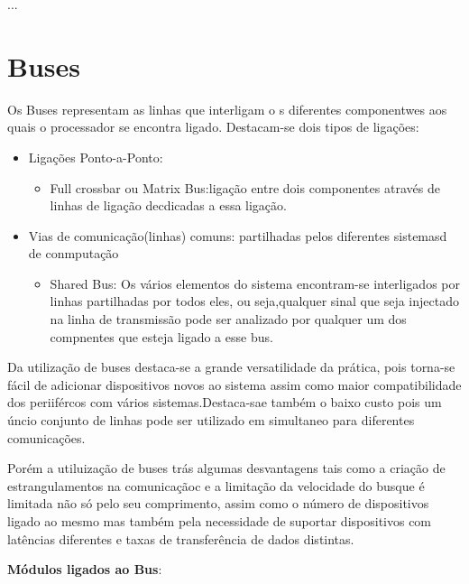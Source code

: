 \documentclass[10pt,a4paper]{paper}
\begin{document}
	...
	
	\newpage
	
	\section*{Buses}
	
	Os Buses representam as linhas que interligam o s diferentes componentwes aos quais o processador se encontra ligado.
	Destacam-se dois tipos de ligações:
	\begin{itemize}
		\item Ligações Ponto-a-Ponto:
		\begin{itemize}
			\item Full crossbar ou Matrix Bus:ligação entre dois componentes através de linhas de ligação decdicadas a essa ligação.
		\end{itemize}
		\item Vias de comunicação(linhas) comuns: partilhadas pelos diferentes sistemasd de conmputação
		\begin{itemize}
			\item Shared Bus: Os vários elementos do sistema encontram-se interligados por linhas partilhadas por todos eles, ou seja,qualquer sinal que seja injectado na linha de transmissão pode ser analizado por qualquer um dos compnentes que esteja ligado a esse bus.
		\end{itemize}
	\end{itemize}
	
	Da utilização de buses destaca-se a grande  versatilidade da prática, pois torna-se fácil de adicionar dispositivos novos ao sistema assim como maior compatibilidade dos periifércos com vários sistemas.Destaca-sae também o baixo custo  pois um úncio conjunto de linhas pode ser utilizado em simultaneo para diferentes comunicações.
	
	Porém a utiluização de buses trás algumas desvantagens tais como a criação de estrangulamentos na comunicaçãoc e a limitação da velocidade do busque é limitada não só pelo seu comprimento, assim como o número de dispositivos ligado ao mesmo mas também pela necessidade de suportar dispositivos com latências diferentes e taxas de transferência de dados distintas.\\
	
	\begin{flushleft}
	\textbf{Módulos ligados ao Bus}:	
	\end{flushleft}
\end{document}
